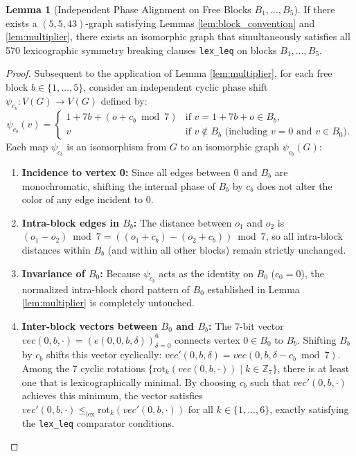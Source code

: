 \documentclass[11pt,a4paper]{article}
\theoremstyle{definition}
\newtheorem{lemma}{Lemma}
\begin{document}
\begin{lemma}[Independent Phase Alignment on Free Blocks $B_1, \dots, B_5$]
\label{lem:phase_shifts}
If there exists a $(5,5,43)$-graph satisfying Lemmas \ref{lem:block_convention} and \ref{lem:multiplier}, there exists an isomorphic graph that simultaneously satisfies all 570 lexicographic symmetry breaking clauses \texttt{lex\_leq} on blocks $B_1, \dots, B_5$.
\end{lemma}
\begin{proof}
Subsequent to the application of Lemma \ref{lem:multiplier}, for each free block $b \in \{1, \dots, 5\}$, consider an independent cyclic phase shift $\psi_{c_b}: V(G) \to V(G)$ defined by:
\[
\psi_{c_b}(v) = \begin{cases}
1 + 7b + (o + c_b \bmod 7) & \text{if } v = 1 + 7b + o \in B_b, \\
v & \text{if } v \notin B_b \text{ (including } v = 0 \text{ and } v \in B_0).
\end{cases}
\]
Each map $\psi_{c_b}$ is an isomorphism from $G$ to an isomorphic graph $\psi_{c_b}(G)$:
\begin{enumerate}
    \item \textbf{Incidence to vertex 0:} Since all edges between 0 and $B_b$ are monochromatic, shifting the internal phase of $B_b$ by $c_b$ does not alter the color of any edge incident to 0.
    \item \textbf{Intra-block edges in $B_b$:} The distance between $o_1$ and $o_2$ is $(o_1 - o_2) \bmod 7 = ((o_1 + c_b) - (o_2 + c_b)) \bmod 7$, so all intra-block distances within $B_b$ (and within all other blocks) remain strictly unchanged.
    \item \textbf{Invariance of $B_0$:} Because $\psi_{c_b}$ acts as the identity on $B_0$ ($c_0 = 0$), the normalized intra-block chord pattern of $B_0$ established in Lemma \ref{lem:multiplier} is completely untouched.
    \item \textbf{Inter-block vectors between $B_0$ and $B_b$:} The 7-bit vector $vec(0, b, \cdot) = (e(0, 0, b, \delta))_{\delta=0}^{6}$ connects vertex $0 \in B_0$ to $B_b$. Shifting $B_b$ by $c_b$ shifts this vector cyclically: $vec'(0, b, \delta) = vec(0, b, \delta - c_b \bmod 7)$. Among the 7 cyclic rotations $\{\text{rot}_k(vec(0, b, \cdot)) \mid k \in \mathbb{Z}_7\}$, there is at least one that is lexicographically minimal. By choosing $c_b$ such that $vec'(0, b, \cdot)$ achieves this minimum, the vector satisfies $vec'(0, b, \cdot) \le_{\text{lex}} \text{rot}_k(vec'(0, b, \cdot))$ for all $k \in \{1, \dots, 6\}$, exactly satisfying the \texttt{lex\_leq} comparator conditions.

\end{enumerate}
\end{proof}
\end{document}
